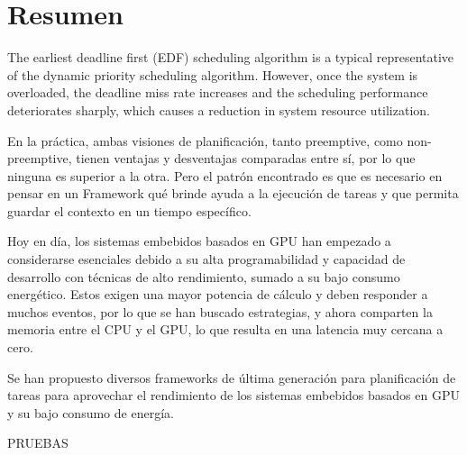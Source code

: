 \section{Resumen}

The earliest deadline first (EDF) scheduling algorithm is a typical representative of the dynamic priority scheduling algorithm. However, once the system is overloaded, the deadline miss rate increases and the scheduling performance deteriorates sharply, which causes a reduction in system resource utilization.

En la práctica, ambas visiones de planificación, tanto preemptive, como non-preemptive, tienen ventajas y desventajas comparadas entre sí, por lo que ninguna es superior a la otra. Pero el patrón encontrado es que es necesario en pensar en un Framework qué brinde ayuda a la ejecución de tareas y que permita guardar el contexto en un tiempo específico. 

Hoy en día, los sistemas embebidos basados en GPU han empezado a considerarse esenciales debido a su alta programabilidad y capacidad de desarrollo con técnicas de alto rendimiento, sumado a su bajo consumo energético. Estos exigen una mayor potencia de cálculo y deben responder a muchos eventos, por lo que se han buscado estrategias, y ahora comparten la memoria entre el CPU y el GPU, lo que resulta en una latencia muy cercana a cero.

Se han propuesto diversos frameworks de última generación para planificación de tareas para aprovechar el rendimiento de los sistemas embebidos basados en GPU y su bajo consumo de energía.

PRUEBAS

\cite{RGEM}
\cite{GPES}
\cite{EffiSha}
\cite{GPUArt}




